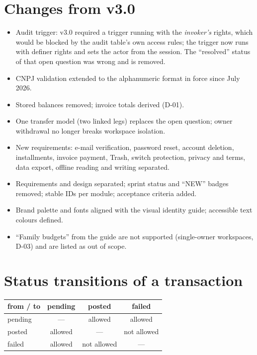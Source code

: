 \documentclass[11pt,a4paper]{article}
\begin{document}
\appendix
\section{Changes from v3.0}
\begin{itemize}
  \item Audit trigger: v3.0 required a trigger running with the \emph{invoker's} rights, which would be blocked by the audit table's own access rules; the trigger now runs with definer rights and sets the actor from the session. The ``resolved'' status of that open question was wrong and is removed.
  \item CNPJ validation extended to the alphanumeric format in force since July 2026.
  \item Stored balances removed; invoice totals derived (D-01).
  \item One transfer model (two linked legs) replaces the open question; owner withdrawal no longer breaks workspace isolation.
  \item New requirements: e-mail verification, password reset, account deletion, installments, invoice payment, Trash, switch protection, privacy and terms, data export, offline reading and writing separated.
  \item Requirements and design separated; sprint status and ``NEW'' badges removed; stable IDs per module; acceptance criteria added.
  \item Brand palette and fonts aligned with the visual identity guide; accessible text colours defined.
  \item ``Family budgets'' from the guide are not supported (single-owner workspaces, D-03) and are listed as out of scope.
\end{itemize}

\section{Status transitions of a transaction}
\begin{center}
\begin{tabular}{@{}lccc@{}}
\toprule
\textbf{from / to} & \textbf{pending} & \textbf{posted} & \textbf{failed} \\
\midrule
pending & --- & allowed & allowed \\
posted  & allowed & --- & not allowed \\
failed  & allowed & not allowed & --- \\
\bottomrule
\end{tabular}
\end{center}
\end{document}
